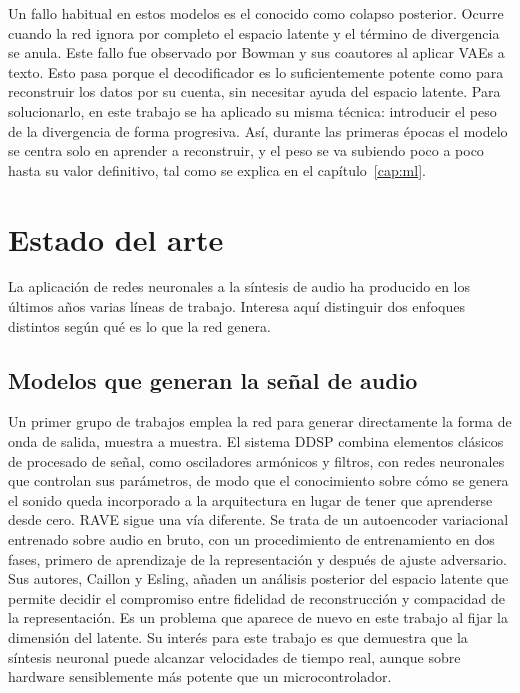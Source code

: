 Un fallo habitual en estos modelos es el conocido como colapso posterior.
Ocurre cuando la red ignora por completo el espacio latente y el término 
de divergencia se anula. Este fallo fue observado por Bowman y sus 
coautores \cite{Bowman2016} al aplicar VAEs a texto. Esto pasa porque 
el decodificador es lo suficientemente potente como para reconstruir los 
datos por su cuenta, sin necesitar ayuda del espacio latente. Para solucionarlo, 
en este trabajo se ha aplicado su misma técnica: introducir el peso de la 
divergencia de forma progresiva. Así, durante las primeras épocas el modelo
se centra solo en aprender a reconstruir, y el peso se va subiendo poco a poco
hasta su valor definitivo, tal como se explica en el capítulo~\ref{cap:ml}.

\section{Estado del arte}

La aplicación de redes neuronales a la síntesis de audio ha producido en los
últimos años varias líneas de trabajo. Interesa aquí distinguir dos enfoques
distintos según qué es lo que la red genera.

\subsection{Modelos que generan la señal de audio}

Un primer grupo de trabajos emplea la red para generar directamente la forma de
onda de salida, muestra a muestra. El sistema DDSP \cite{Engel2020} combina
elementos clásicos de procesado de señal, como osciladores armónicos y filtros,
con redes neuronales que controlan sus parámetros, de modo que el conocimiento
sobre cómo se genera el sonido queda incorporado a la arquitectura en lugar de
tener que aprenderse desde cero. RAVE \cite{Caillon2021} sigue una vía
diferente. Se trata de un autoencoder variacional entrenado sobre audio en
bruto, con un procedimiento de entrenamiento en dos fases, primero de
aprendizaje de la representación y después de ajuste adversario. Sus autores, Caillon y
Esling, añaden un análisis posterior del espacio latente que permite decidir el
compromiso entre fidelidad de reconstrucción y compacidad de la representación.
Es un problema que aparece de nuevo en este trabajo al fijar la dimensión del
latente. Su interés para este trabajo es que demuestra que la síntesis neuronal 
puede alcanzar velocidades de tiempo real, aunque sobre
hardware sensiblemente más potente que un microcontrolador.

